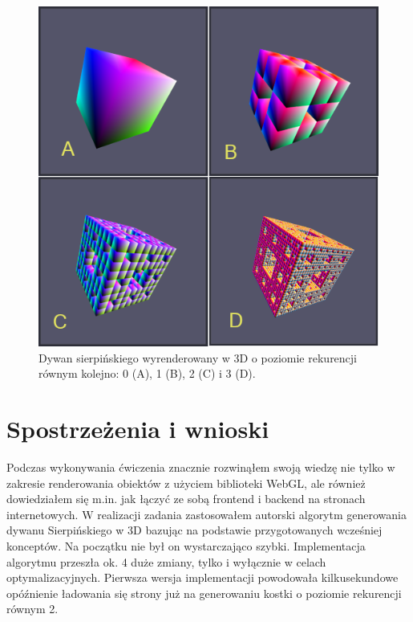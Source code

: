 \documentclass[a4paper,11pt]{article}
\begin{document}
\begin{figure}[h!]
    \centering
    \includegraphics[width=1.0\linewidth]{sierp.png}
    \caption{Dywan sierpińskiego wyrenderowany w 3D o poziomie rekurencji równym kolejno: 0 (A), 1 (B), 2 (C) i 3 (D).}
    \label{fig:pic3}
\end{figure}
\newpage

\newpage


\section{Spostrzeżenia i wnioski}
Podczas wykonywania ćwiczenia znacznie rozwinąłem swoją wiedzę nie tylko w zakresie renderowania obiektów z użyciem biblioteki WebGL, ale również dowiedziałem się m.in. jak łączyć ze sobą frontend i backend na stronach internetowych. W realizacji zadania zastosowałem autorski algorytm generowania dywanu Sierpińskiego w 3D bazując na podstawie przygotowanych wcześniej konceptów. Na początku nie był on wystarczająco szybki. Implementacja algorytmu przeszła ok. 4 duże zmiany, tylko i wyłącznie w celach optymalizacyjnych. Pierwsza wersja implementacji powodowała kilkusekundowe opóźnienie ładowania się strony już na generowaniu kostki o poziomie rekurencji równym 2.
\end{document}
